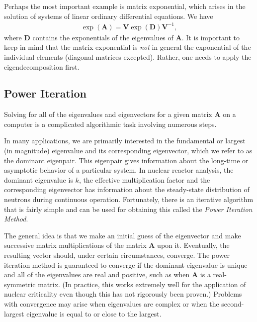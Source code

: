 Perhaps the most important example is matrix exponential, which arises in the solution of systems of linear ordinary differential equations. We have
\begin{align}
  \exp ( \mathbf{A} ) =  \mathbf{V} \exp ( \mathbf{D} ) \mathbf{V}^{-1} ,
\end{align}
where $\mathbf{D}$ contains the exponentials of the eigenvalues of $\mathbf{A}$. It is important to keep in mind that the matrix exponential is \emph{not} in general the exponential of the individual elements (diagonal matrices excepted). Rather, one needs to apply the eigendecomposition first.


\subsection{Power Iteration}

Solving for all of the eigenvalues and eigenvectors for a given matrix $\mathbf{A}$ on a computer is a complicated algorithmic task involving numerous steps. 

In many applications, we are primarily interested in the fundamental or largest (in magnitude) eigenvalue and its corresponding eigenvector, which we refer to as the dominant eigenpair. This eigenpair gives information about the long-time or asymptotic behavior of a particular system. In nuclear reactor analysis, the dominant eigenvalue is $k$, the effective multiplication factor and the corresponding eigenvector has information about the steady-state distribution of neutrons during continuous operation. Fortunately, there is an iterative algorithm that is fairly simple and can be used for obtaining this called the \emph{Power Iteration Method}. 

The general idea is that we make an initial guess of the eigenvector and make successive matrix multiplications of the matrix $\mathbf{A}$ upon it. Eventually, the resulting vector should, under certain circumstances, converge. The power iteration method is guaranteed to converge if the dominant eigenvalue is unique and all of the eigenvalues are real and positive, such as when $\mathbf{A}$ is a real-symmetric matrix. (In practice, this works extremely well for the application of nuclear criticality even though this has not rigorously been proven.) Problems with convergence may arise when eigenvalues are complex or when the second-largest eigenvalue is equal to or close to the largest.

